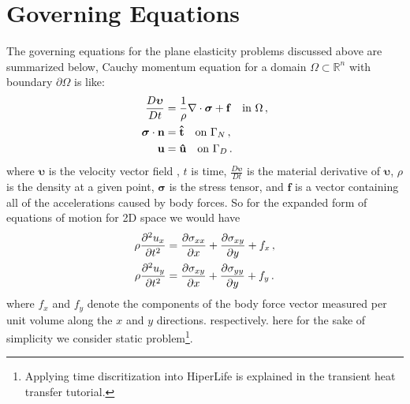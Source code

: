 \documentclass[]{article}
\begin{document}
\section{Governing Equations} \label{sec: ge}
The governing equations for the plane elasticity problems discussed above are summarized below, Cauchy momentum equation for a domain $\Omega \subset \mathbb{R}^n$ with boundary $\partial \Omega$ is like:
\begin{equation}\label{eq2}
	\begin{aligned}
		\frac{D \boldsymbol{\upsilon}}{Dt}  &=\frac{1}{\rho} \nabla \cdot \boldsymbol{\sigma} + \mathbf{f} \quad \text{in} \ \Omega\thinspace,\\
		\boldsymbol{\sigma} \cdot \mathbf{n} &= \mathbf{\hat{t}} \quad \text{on} \ \Gamma_N\thinspace,\\
		\mathbf{u}&= \mathbf{\hat{u}}\quad \text{on} \ \Gamma_D\thinspace.
	\end{aligned}
\end{equation}
where $\boldsymbol{\upsilon}$ is the velocity vector field , $t$ is time,
$\frac {D\boldsymbol{\upsilon}}{Dt}$ is the material derivative of $\boldsymbol{\upsilon}$, $\rho$  is the density at a given point, $\boldsymbol {\sigma }$ is the stress tensor, and $\mathbf{f}$ is a vector containing all of the accelerations caused by body forces. So for the expanded form of equations of motion for 2D space we would have
\begin{equation}\label{eq3}
	\begin{aligned}
		\rho \frac{\partial^2 u_x}{\partial t^2}&= \frac{\partial \sigma_{xx}}{\partial x} +  \frac{\partial \sigma_{xy}}{\partial y} + f_x\thinspace,\\
		\rho \frac{\partial^2 u_y}{\partial t^2}&= \frac{\partial \sigma_{xy}}{\partial x} +  \frac{\partial \sigma_{yy}}{\partial y} + f_y\thinspace.
	\end{aligned}
\end{equation}
where $f_x$ and $f_y$ denote the components of the body force vector measured per unit volume along the $x$ and $y$ directions. respectively. here for the sake of simplicity we consider static problem\footnote{Applying time discritization into HiperLife is explained in the transient heat transfer tutorial.}.
\end{document}
